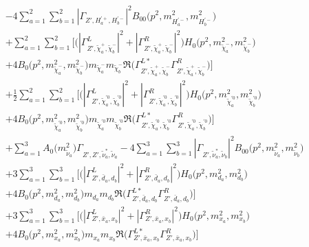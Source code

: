 \begin{itemize}
\begin{align}
 &-4 \sum_{a=1}^{2}\sum_{b=1}^{2}|{\Gamma_{{Z'},H^{'+}_{{a}},H^{'-}_{{b}}}}|^2 {B_{00}\Big(p^{2},m^2_{H^{'-}_{{a}}},m^2_{H^{'-}_{{b}}}\Big)}  \nonumber \\ 
 &+\sum_{a=1}^{2}\sum_{b=1}^{2} \Big[\Big(|{\Gamma^L_{{Z'},\tilde{\chi}^+_{{a}},\tilde{\chi}^-_{{b}}}}|^2 + |{\Gamma^R_{{Z'},\tilde{\chi}^+_{{a}},\tilde{\chi}^-_{{b}}}}|^2\Big){H_0\Big(p^{2},m^2_{\tilde{\chi}^-_{{a}}},m^2_{\tilde{\chi}^-_{{b}}}\Big)} \nonumber \\ & +4 {B_0\Big(p^{2},m^2_{\tilde{\chi}^-_{{a}}},m^2_{\tilde{\chi}^-_{{b}}}\Big)} m_{\tilde{\chi}^-_{{a}}} m_{\tilde{\chi}^-_{{b}}} {\Re\Big({\Gamma^{L*}_{{Z'},\tilde{\chi}^+_{{a}},\tilde{\chi}^-_{{b}}}} {\Gamma^R_{{Z'},\tilde{\chi}^+_{{a}},\tilde{\chi}^-_{{b}}}} \Big)} \Big]\nonumber \\ 
 &+\frac{1}{2} \sum_{a=1}^{2}\sum_{b=1}^{2} \Big[\Big(|{\Gamma^L_{{Z'},\tilde{\chi}^{'0}_{{a}},\tilde{\chi}^{'0}_{{b}}}}|^2 + |{\Gamma^R_{{Z'},\tilde{\chi}^{'0}_{{a}},\tilde{\chi}^{'0}_{{b}}}}|^2\Big){H_0\Big(p^{2},m^2_{\tilde{\chi}^{'0}_{{a}}},m^2_{\tilde{\chi}^{'0}_{{b}}}\Big)} \nonumber \\ & +4 {B_0\Big(p^{2},m^2_{\tilde{\chi}^{'0}_{{a}}},m^2_{\tilde{\chi}^{'0}_{{b}}}\Big)} m_{\tilde{\chi}^{'0}_{{a}}} m_{\tilde{\chi}^{'0}_{{b}}} {\Re\Big({\Gamma^{L*}_{{Z'},\tilde{\chi}^{'0}_{{a}},\tilde{\chi}^{'0}_{{b}}}} {\Gamma^R_{{Z'},\tilde{\chi}^{'0}_{{a}},\tilde{\chi}^{'0}_{{b}}}} \Big)} \Big] \nonumber \\ 
 &+\sum_{a=1}^{3}{A_0\Big(m^2_{\tilde{\nu}_{{a}}}\Big)} {\Gamma_{{Z'},{Z'},\tilde{\nu}^*_{{a}},\tilde{\nu}_{{a}}}} -4 \sum_{a=1}^{3}\sum_{b=1}^{3}|{\Gamma_{{Z'},\tilde{\nu}^*_{{a}},\tilde{\nu}_{{b}}}}|^2 {B_{00}\Big(p^{2},m^2_{\tilde{\nu}_{{a}}},m^2_{\tilde{\nu}_{{b}}}\Big)}  \nonumber \\ 
 &+3 \sum_{a=1}^{3}\sum_{b=1}^{3} \Big[\Big(|{\Gamma^L_{{Z'},\bar{d}_{{a}},d_{{b}}}}|^2 + |{\Gamma^R_{{Z'},\bar{d}_{{a}},d_{{b}}}}|^2\Big){H_0\Big(p^{2},m^2_{d_{{a}}},m^2_{d_{{b}}}\Big)} \nonumber \\ & +4 {B_0\Big(p^{2},m^2_{d_{{a}}},m^2_{d_{{b}}}\Big)} m_{d_{{a}}} m_{d_{{b}}} {\Re\Big({\Gamma^{L*}_{{Z'},\bar{d}_{{a}},d_{{b}}}} {\Gamma^R_{{Z'},\bar{d}_{{a}},d_{{b}}}} \Big)} \Big] \nonumber \\ 
 &+3 \sum_{a=1}^{3}\sum_{b=1}^{3} \Big[\Big(|{\Gamma^L_{{Z'},\bar{x}_{{a}},x_{{b}}}}|^2 + |{\Gamma^R_{{Z'},\bar{x}_{{a}},x_{{b}}}}|^2\Big){H_0\Big(p^{2},m^2_{x_{{a}}},m^2_{x_{{b}}}\Big)} \nonumber \\ & +4 {B_0\Big(p^{2},m^2_{x_{{a}}},m^2_{x_{{b}}}\Big)} m_{x_{{a}}} m_{x_{{b}}} {\Re\Big({\Gamma^{L*}_{{Z'},\bar{x}_{{a}},x_{{b}}}} {\Gamma^R_{{Z'},\bar{x}_{{a}},x_{{b}}}} \Big)} \Big] \nonumber \\ 

\end{align}
\end{itemize}
